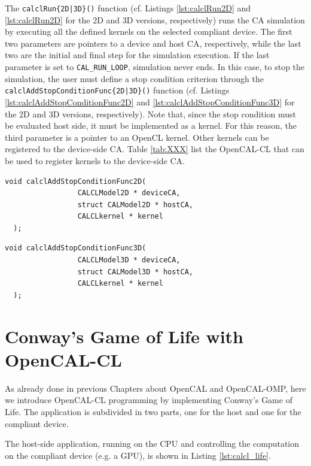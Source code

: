 The \verb'calclRun{2D|3D}()' function (cf. Listings
\ref{lst:calclRun2D} and \ref{lst:calclRun2D} for the 2D and 3D
versions, respectively) runs the CA simulation by executing all the
defined kernels on the selected compliant device. The first two
parameters are pointers to a device and host CA, respectively, while
the last two are the initial and final step for the simulation
execution. If the last parameter is set to \verb'CAL_RUN_LOOP',
simulation never ends. In this case, to stop the simulation, the user
must define a stop condition criterion through the
\verb'calclAddStopConditionFunc{2D|3D}()' function (cf. Listings
\ref{lst:calclAddStopConditionFunc2D} and
\ref{lst:calclAddStopConditionFunc3D} for the 2D and 3D versions,
respectively). Note that, since the stop condition must be evaluated
host side, it must be implemented as a kernel. For this reason, the
third parameter is a pointer to an OpenCL kernel. Other kernels can be
registered to the device-side CA. Table \ref{tab:XXX} list the
OpenCAL-CL that can be used to register kernels to the device-side CA.


\begin{lstlisting}[float,floatplacement=H, label=lst:calclAddStopConditionFunc2D, caption=The calclAddStopConditionFunc2D function., numbers=none]
  void calclAddStopConditionFunc2D(
                 CALCLModel2D * deviceCA,
                 struct CALModel2D * hostCA,
                 CALCLkernel * kernel
  );
\end{lstlisting}

\begin{lstlisting}[float,floatplacement=H, label=lst:calclAddStopConditionFunc3D, caption=The calclAddStopConditionFunc3D function., numbers=none]
  void calclAddStopConditionFunc3D(
                 CALCLModel3D * deviceCA,
                 struct CALModel3D * hostCA,
                 CALCLkernel * kernel
  );
\end{lstlisting}


\section{Conway's Game of Life with OpenCAL-CL}\label{sec:calcl_life}

As already done in previous Chapters about OpenCAL and OpenCAL-OMP,
here we introduce OpenCAL-CL programming by implementing Conway's Game
of Life. The application is subdivided in two parts, one for the host
and one for the compliant device.

The host-side application, running on the CPU and controlling the
computation on the compliant device (e.g. a GPU), is shown in Listing
\ref{lst:calcl_life}.


